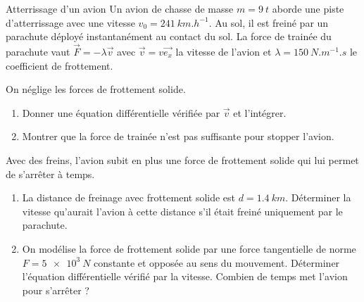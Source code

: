 \begin{exo}[MPSI]{Atterrissage d'un avion}
 Un avion de chasse de masse $m=\SI{9}{t}$ aborde une piste d'atterrissage avec une vitesse $v_{0}=\SI{241}{km.h^{-1}}$. Au sol,
 il est freiné par un parachute déployé instantanément au contact du sol. La force de trainée
 du parachute vaut $\Vec{F} = - \lambda \Vec{v}$ avec $\Vec{v}=v\Vec{e_x}$ la vitesse de l'avion et $\lambda = \SI{150}{N.m^{-1}.s}$ le coefficient de frottement.
 \begin{quest}
  \item  On néglige les forces de frottement solide.
	\begin{enumerate}
	 \item Donner une équation différentielle vérifiée par $\Vec{v}$ et l'intégrer.


	 \item Montrer que la force de trainée n'est pas suffisante pour stopper l'avion.


	\end{enumerate}
  \item Avec des freins, l'avion subit en plus une force de frottement solide qui lui permet de s'arrêter à temps.
	\begin{enumerate}

\item
  La distance de freinage avec frottement solide est $d=\SI{1,4}{km}$. Déterminer la vitesse qu'aurait l'avion à cette distance s'il était freiné uniquement par le parachute.
  \item On modélise la force de frottement solide par une force tangentielle de norme $F = \SI{5e3}{N}$ constante et opposée au sens du mouvement. Déterminer l'équation différentielle
vérifié par la vitesse. Combien de temps met l'avion pour s'arrêter ?


\end{enumerate}
\end{quest}
\end{exo}
